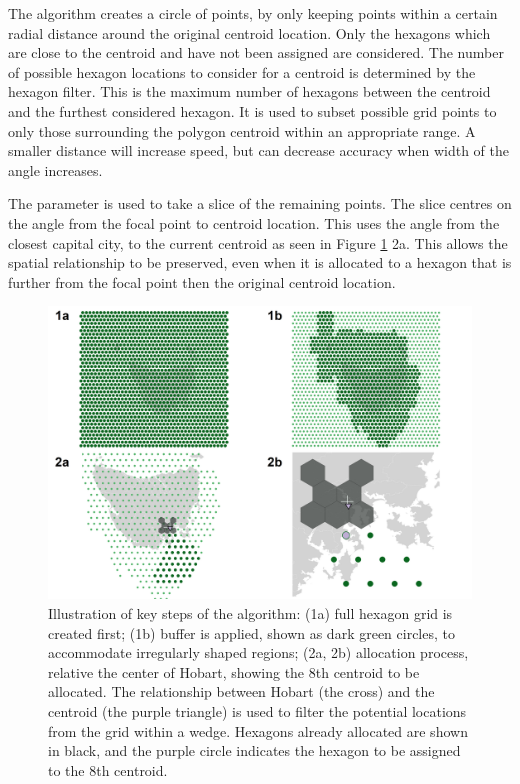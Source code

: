 The algorithm creates a circle of points, by only keeping points within a certain radial distance around the original centroid location. Only the hexagons which are close to the centroid and have not been assigned are considered. The number of possible hexagon locations to consider for a centroid is determined by the hexagon filter. This is the maximum number of hexagons between the centroid and the furthest considered hexagon. It is used to subset possible grid points to only those surrounding the polygon centroid within an appropriate range. A smaller distance will increase speed, but can decrease accuracy when width of the angle increases.

The  parameter is used to take a slice of the remaining points. The slice centres on the angle from the focal point to centroid location. This uses the angle from the closest capital city, to the current centroid as seen in Figure \ref{fig:filterprocess} 2a. This allows the spatial relationship to be preserved, even when it is allocated to a hexagon that is further from the focal point then the original centroid location.

\begin{figure}
\includegraphics[width=0.95\linewidth]{kobakian-cook_files/figure-latex/filterprocess-1} \caption{Illustration of key steps of the algorithm: (1a) full hexagon grid is created first; (1b) buffer is applied, shown as dark green circles, to accommodate irregularly shaped regions; (2a, 2b) allocation process, relative the center of Hobart, showing the 8th centroid to be allocated. The relationship between Hobart (the cross) and the centroid (the purple triangle) is used to filter the potential locations from the grid within a wedge. Hexagons already allocated are shown in black, and the purple circle indicates the hexagon to be assigned to the 8th centroid.}\label{fig:filterprocess}
\end{figure}

